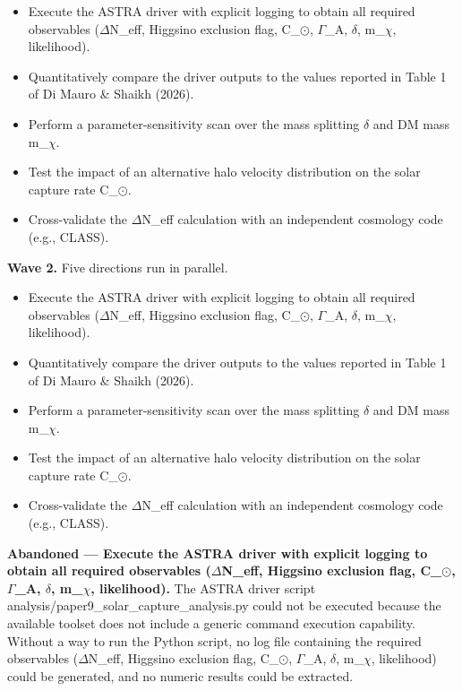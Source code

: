 \documentclass[11pt,a4paper]{article}
\begin{document}
\begin{itemize}
  \item Execute the ASTRA driver with explicit logging to obtain all required observables ($\Delta$N\_eff, Higgsino exclusion flag, C\_$\odot$, $\Gamma$\_A, $\delta$, m\_$\chi$, likelihood).
  \item Quantitatively compare the driver outputs to the values reported in Table 1 of Di Mauro \& Shaikh (2026).
  \item Perform a parameter-sensitivity scan over the mass splitting $\delta$ and DM mass m\_$\chi$.
  \item Test the impact of an alternative halo velocity distribution on the solar capture rate C\_$\odot$.
  \item Cross-validate the $\Delta$N\_eff calculation with an independent cosmology code (e.g., CLASS).
\end{itemize}
\textbf{Wave 2.} Five directions run in parallel.

\begin{itemize}
  \item Execute the ASTRA driver with explicit logging to obtain all required observables ($\Delta$N\_eff, Higgsino exclusion flag, C\_$\odot$, $\Gamma$\_A, $\delta$, m\_$\chi$, likelihood).
  \item Quantitatively compare the driver outputs to the values reported in Table 1 of Di Mauro \& Shaikh (2026).
  \item Perform a parameter-sensitivity scan over the mass splitting $\delta$ and DM mass m\_$\chi$.
  \item Test the impact of an alternative halo velocity distribution on the solar capture rate C\_$\odot$.
  \item Cross-validate the $\Delta$N\_eff calculation with an independent cosmology code (e.g., CLASS).
\end{itemize}
\textbf{Abandoned --- Execute the ASTRA driver with explicit logging to obtain all required observables ($\Delta$N\_eff, Higgsino exclusion flag, C\_$\odot$, $\Gamma$\_A, $\delta$, m\_$\chi$, likelihood).} The ASTRA driver script analysis/paper9\_solar\_capture\_analysis.py could not be executed because the available toolset does not include a generic command execution capability. Without a way to run the Python script, no log file containing the required observables ($\Delta$N\_eff, Higgsino exclusion flag, C\_$\odot$, $\Gamma$\_A, $\delta$, m\_$\chi$, likelihood) could be generated, and no numeric results could be extracted.
\end{document}
